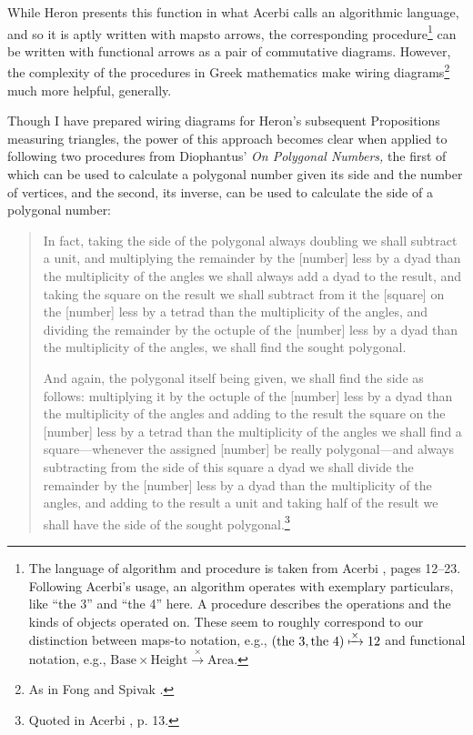 \documentclass[11pt]{article}
\begin{document}
While Heron presents this function in what Acerbi \citep{acerbi2021} calls an algorithmic language, and so it is aptly written with mapsto arrows, the corresponding procedure\footnote{The language of algorithm and procedure is taken from Acerbi \citep{acerbi2021}, pages 12--23. Following Acerbi's usage, an algorithm operates with exemplary particulars, like ``the 3'' and ``the 4'' here. A procedure describes the operations and the kinds of objects operated on. These seem to roughly correspond to our distinction between maps-to notation, e.g., \(\left(\text{the }3, \text{the 4}\right)\xmapsto{\times} 12 \) and functional notation, e.g., \(\text{Base}\times\text{Height}\xrightarrow{\times} \text{Area}\).} can be written with functional arrows as a pair of commutative diagrams. However, the complexity of the procedures in Greek mathematics make wiring diagrams\footnote{As in Fong and Spivak \citep{fong-spivak2019}.} much more helpful, generally.

Though I have prepared wiring diagrams for Heron's subsequent Propositions measuring triangles, the power of this approach becomes clear when applied to following two procedures from Diophantus' \textit{On Polygonal Numbers,} the first of which can be used to calculate a polygonal number given its side and the number of vertices, and the second, its inverse, can be used to calculate the side of a polygonal number:

\begin{quotation}
In fact, taking the side of the polygonal always doubling we shall subtract a unit, and multiplying the remainder by the [number] less by a dyad than the multiplicity of the angles we shall always add a dyad to the result, and taking the square on the result we shall subtract from it the [square] on the [number] less by a tetrad than the multiplicity of the angles, and dividing the remainder by the octuple of the [number] less by a dyad than the multiplicity of the angles, we shall find the sought polygonal.

And again, the polygonal itself being given, we shall find the side as follows: multiplying it by the octuple of the [number] less by a dyad than the multiplicity of the angles and adding to the result the square on the [number] less by a tetrad than the multiplicity of the angles we shall find a square---whenever the assigned [number] be really polygonal---and always subtracting from the side of this square a dyad we shall divide the remainder by the [number] less by a dyad than the multiplicity of the angles, and adding to the result a unit and taking half of the result we shall have the side of the sought polygonal.\footnote{Quoted in Acerbi \protect\citep{acerbi2021}, p. 13.}
\end{quotation}
\end{document}
